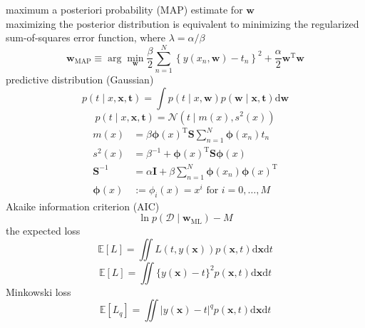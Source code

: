 \documentclass{article}
\begin{document}
	maximum a posteriori probability (MAP) estimate for $\mathbf{w}$
	\\
	maximizing the posterior distribution is equivalent to minimizing the regularized sum-of-squares error function, where $\lambda=\alpha/\beta$
	$$
	\mathbf{w}_{\mathrm{MAP}}\equiv\arg\min_{\mathbf{w}}\frac{\beta}{2} \sum_{n=1}^{N}\left\{y\left(x_{n}, \mathbf{w}\right)-t_{n}\right\}^{2}+\frac{\alpha}{2} \mathbf{w}^{\mathrm{T}} \mathbf{w}
	$$
	predictive distribution (Gaussian)
	$$
	p(t \mid x, \mathbf{x}, \mathbf{t})=\int p(t \mid x, \mathbf{w}) p(\mathbf{w} \mid \mathbf{x}, \mathbf{t}) \mathrm{d} \mathbf{w}
	$$
	$$
	p(t \mid x, \mathbf{x}, \mathbf{t})=\mathcal{N}\left(t \mid m(x), s^{2}(x)\right)
	$$
	$$
	\begin{aligned}
	m(x) &=\beta \boldsymbol{\phi}(x)^{\mathrm{T}} \mathbf{S} \sum_{n=1}^{N} \boldsymbol{\phi}\left(x_{n}\right) t_{n} \\
	s^{2}(x) &=\beta^{-1}+\boldsymbol{\phi}(x)^{\mathrm{T}} \mathbf{S} \boldsymbol{\phi}(x) \\
	\mathbf{S}^{-1}&=\alpha \mathbf{I}+\beta \sum_{n=1}^{N} \boldsymbol{\phi}\left(x_{n}\right) \boldsymbol{\phi}(x)^{\mathrm{T}}\\
	\boldsymbol{\phi}(x)&:=\phi_i(x)=x^i \text{ for }i=0,\dots,M
	\end{aligned}
	$$
	Akaike information criterion (AIC)
	$$
	\ln p\left(\mathcal{D} \mid \mathbf{w}_{\mathrm{ML}}\right)-M
	$$
	the expected loss 
	$$
	\mathbb{E}[L]=\iint L(t, y(\mathbf{x})) p(\mathbf{x}, t) \mathrm{d} \mathbf{x} \mathrm{d} t
	$$
	$$
	\mathbb{E}[L]=\iint\{y(\mathbf{x})-t\}^{2} p(\mathbf{x}, t) \mathrm{d} \mathbf{x} \mathrm{d} t
	$$
	Minkowski loss
	$$
	\mathbb{E}\left[L_{q}\right]=\iint|y(\mathbf{x})-t|^{q} p(\mathbf{x}, t) \mathrm{d} \mathbf{x} \mathrm{d} t
	$$
	
	\pagebreak
	
\end{document}
